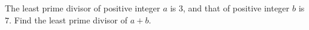 The least prime divisor of positive integer $a$ is $3$, and that of positive integer $b$ is $7$. Find the least prime divisor of $a+b$.

